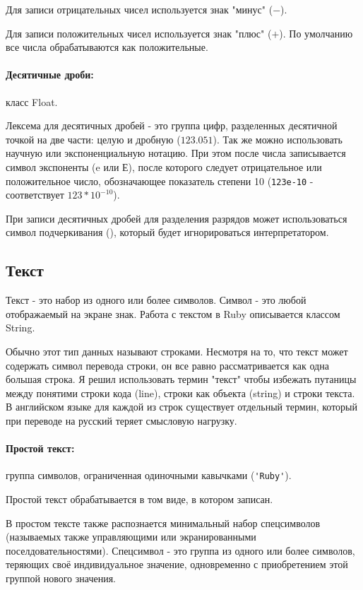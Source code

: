 Для записи отрицательных чисел используется знак "минус" ($-$). 

Для записи положительных чисел используется знак "плюс" ($+$).  По умолчанию все числа обрабатываются как положительные.

\paragraph*{Десятичные дроби:} класс Float.

Лексема для десятичных дробей - это группа цифр, разделенных десятичной точкой на две части: целую и дробную ($123.051$). Так же можно использовать научную или экспоненциальную нотацию. При этом после числа записывается символ экспоненты (e или Е), после которого следует отрицательное или положительное число, обозначающее показатель степени 10 (\verb!123е-10! - соответствует $123 * 10^{-10}$). 

При записи десятичных дробей для разделения разрядов может использоваться символ подчеркивания (\mono{_}), который будет игнорироваться интерпретатором.

\subsection{Текст}

Текст - это набор из одного или более символов. Символ - это любой отображаемый на экране знак. Работа с текстом в Ruby описывается классом String.
\begin{note}
  Обычно этот тип данных называют строками. Несмотря на то, что текст может содержать символ перевода строки, он все равно рассматривается как одна большая строка. Я решил использовать термин "текст" чтобы избежать путаницы между понятими строки кода (line), строки как объекта (string) и строки текста. В английском языке для каждой из строк существует отдельный термин, который при переводе на русский теряет смысловую нагрузку.
\end{note} 
  
\paragraph*{Простой текст:} группа символов, ограниченная одиночными кавычками (\verb!'Ruby'!).  

Простой текст обрабатывается в том виде, в котором записан. 

В простом тексте также распознается минимальный набор спецсимволов (называемых также управляющими или экранированными поселдовательностями). Спецсимвол - это группа из одного или более символов, теряющих своё индивидуальное значение, одновременно с приобретением этой группой нового значения. 

